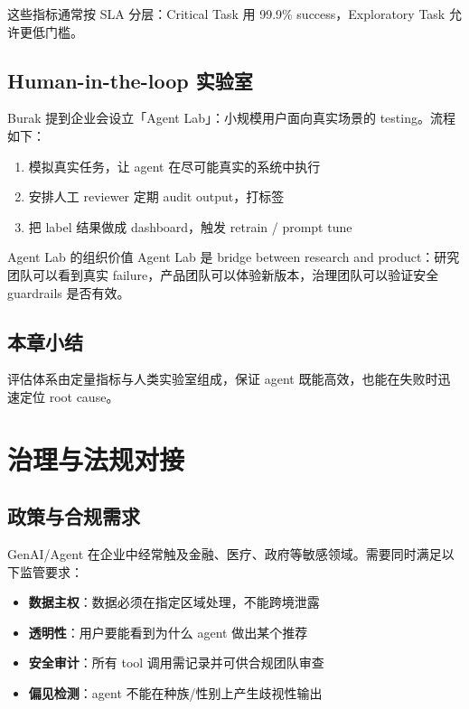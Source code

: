\documentclass[a4paper]{article}
\begin{document}
这些指标通常按 SLA 分层：Critical Task 用 99.9\% success，Exploratory Task 允许更低门槛。

\subsection{Human-in-the-loop 实验室}

Burak 提到企业会设立「Agent Lab」：小规模用户面向真实场景的 testing。流程如下：

\begin{enumerate}
    \item 模拟真实任务，让 agent 在尽可能真实的系统中执行
    \item 安排人工 reviewer 定期 audit output，打标签
    \item 把 label 结果做成 dashboard，触发 retrain / prompt tune
\end{enumerate}

\begin{knowledgebox}{Agent Lab 的组织价值}
Agent Lab 是 bridge between research and product：研究团队可以看到真实 failure，产品团队可以体验新版本，治理团队可以验证安全 guardrails 是否有效。
\end{knowledgebox}

\subsection{本章小结}

评估体系由定量指标与人类实验室组成，保证 agent 既能高效，也能在失败时迅速定位 root cause。

\section{治理与法规对接}

\subsection{政策与合规需求}

GenAI/Agent 在企业中经常触及金融、医疗、政府等敏感领域。需要同时满足以下监管要求：

\begin{itemize}
    \item \textbf{数据主权}：数据必须在指定区域处理，不能跨境泄露
    \item \textbf{透明性}：用户要能看到为什么 agent 做出某个推荐
    \item \textbf{安全审计}：所有 tool 调用需记录并可供合规团队审查
    \item \textbf{偏见检测}：agent 不能在种族/性别上产生歧视性输出
\end{itemize}
\end{document}

